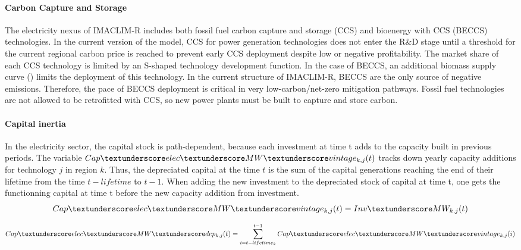 \paragraph{ Carbon Capture and Storage }
The electricity nexus of IMACLIM-R includes both fossil fuel carbon capture and storage (CCS) and bioenergy with CCS (BECCS) technologies. In the current version of the model, CCS for power generation technologies does not enter the R\&D stage until a threshold for the current regional carbon price is reached to prevent early CCS deployment despite low or negative profitability. The market share of each CCS technology is limited by an S-shaped technology development function. In the case of BECCS, an additional biomass supply curve (\cite{Hoogwijk2009}) limits the deployment of this technology. In the current structure of IMACLIM-R, BECCS are the only source of negative emissions. Therefore, the pace of BECCS deployment is critical in very low-carbon/net-zero mitigation pathways. Fossil fuel technologies are not allowed to be retrofitted with CCS, so new power plants must be built to capture and store carbon.


\paragraph{ Capital inertia }
In the electricity sector, the capital stock is path-dependent, because each investment at time t adds to the capacity built in previous periods. The variable $Cap\textunderscore elec\textunderscore MW\textunderscore vintage_{k,j}(t)$ tracks down yearly capacity additions for technology $j$ in region $k$. Thus, the depreciated capital at the time $t$ is the sum of the capital generations reaching the end of their lifetime from the time $t - lifetime$ to $t - 1$. When adding the new investment to the depreciated stock of capital at time t, one gets the functionning capital at time t before the new capacity addition from investment.
\begin{dmath}
    Cap\textunderscore elec \textunderscore MW\textunderscore vintage_{k,j}(t) = Inv\textunderscore MW_{k,j}(t)
    \label{eqn:Cap_elec_vintage}
\end{dmath}

\begin{dmath}
    Cap\textunderscore elec\textunderscore MW\textunderscore dep_{k,j}(t) = \sum_{i = t - lifetime_{k}}^{t-1}Cap\textunderscore elec\textunderscore MW\textunderscore vintage_{k,j}(i)
    \label{eqn:Cap_elec_dep}
\end{dmath}


